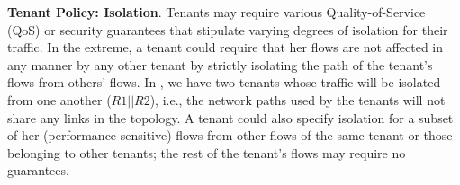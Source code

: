 \begin{compactitemize}
\item \textbf{Tenant Policy: Isolation}. Tenants may require various
  Quality-of-Service (QoS) or security guarantees that stipulate
  varying degrees of isolation for their traffic. In the extreme, a
  tenant could require that her flows are not affected in any manner
  by any other tenant by strictly isolating the path of the tenant's
  flows from others' flows. In , we have two
  tenants whose traffic will be isolated from one another ($R1||R2$), 
  i.e., the
  network paths used by the tenants will not share any links in the
  topology.  A tenant could also specify isolation for a subset of her
  (performance-sensitive) flows from other flows of the same tenant or
  those belonging to other tenants; the rest of the tenant's flows may
  require no guarantees.

 


\end{compactitemize}
